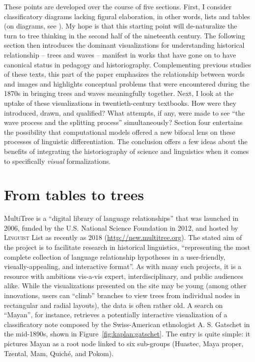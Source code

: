 \documentclass[output=paper]{langscibook}
\begin{document}
These points are developed over the course of five sections. First, I consider classificatory diagrams lacking figural elaboration, in other words, lists and tables (on diagrams, see \citealt{Bigg2016}). My hope is that this starting point will de-naturalize the turn to tree thinking in the second half of the nineteenth century. The following section then introduces the dominant visualizations for understanding historical relationship -- trees and waves -- manifest in works that have gone on to have canonical status in pedagogy and historiography. Complementing previous studies of these texts, this part of the paper emphasizes the relationship between words and images and highlights conceptual problems that were encountered during the 1870s in bringing trees and waves meaningfully together. Next, I look at the uptake of these visualizations in twentieth-century textbooks. How were they introduced, drawn, and qualified? What attempts, if any, were made to see ``the wave process and the splitting process'' simultaneously? Section four entertains the possibility that computational models offered a new bifocal lens on these processes of linguistic differentiation. The conclusion offers a few ideas about the benefits of integrating the historiography of science and linguistics when it comes to specifically \emph{visual} formalizations.

\section{From tables to trees}
\label{sec:kaplan:tablestrees}

MultiTree is a ``digital library of language relationships'' that was launched in 2006, funded by the U.S. National Science Foundation in 2012, and hosted by \textsc{Linguist} List as recently as 2018 (\url{http://new.multitree.org}). The stated aim of the project is to facilitate research in historical linguistics, ``representing the most complete collection of language relationship hypotheses in a user-friendly, visually-appealing, and interactive format''. As with many such projects, it is a resource with ambitions vis-a-vis expert, interdisciplinary, and public audiences alike. While the visualizations presented on the site may be young (among other innovations, users can ``climb'' branches to view trees from individual nodes in rectangular and radial layouts), the data is often rather old. A search on ``Mayan'', for instance, retrieves a potentially interactive visualization of a classificatory note composed by the Swiss-American ethnologist A. S. Gatschet in the mid-1890s, shown in Figure~\ref{fig:kaplan:gatschet}. The entry is quite simple: it pictures Mayan as a root node linked to six sub-groups (Huastec, Maya proper, Tzental, Mam, Quiché, and Pokom).
\end{document}
